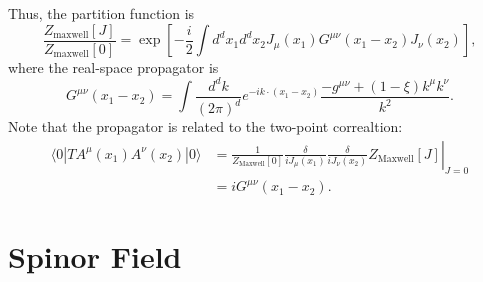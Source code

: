 Thus, the partition function is
\begin{equation}
	\frac{Z_{\mathrm{maxwell}}[J]}{Z_{\mathrm{maxwell}}[0]}
	= \exp\left[-\frac{i}{2}\int d^dx_1 d^dx_2 J_\mu(x_1) G^{\mu\nu}(x_1-x_2) J_\nu(x_2) \right],
\end{equation}
where the real-space propagator is
\begin{equation}
	G^{\mu\nu}(x_1-x_2) = \int \frac{d^d k}{(2\pi)^d} e^{-ik\cdot(x_1-x_2)}\frac{-g^{\mu\nu}+(1-\xi)k^\mu k^\nu}{k^2}.
\end{equation}
Note that the propagator is related to the two-point correaltion:
\begin{equation}
\begin{aligned}
	\langle 0|T A^\mu(x_1) A^\nu(x_2) |0\rangle
	&= \left.\frac{1}{Z_{\mathrm{Maxwell}}[0]}\frac{\delta}{iJ_\mu(x_1)}\frac{\delta}{iJ_\nu(x_2)} Z_{\mathrm{Maxwell}}[J]\right|_{J=0} \\
	&= iG^{\mu\nu}(x_1-x_2).
\end{aligned}
\end{equation}


\section{Spinor Field}

